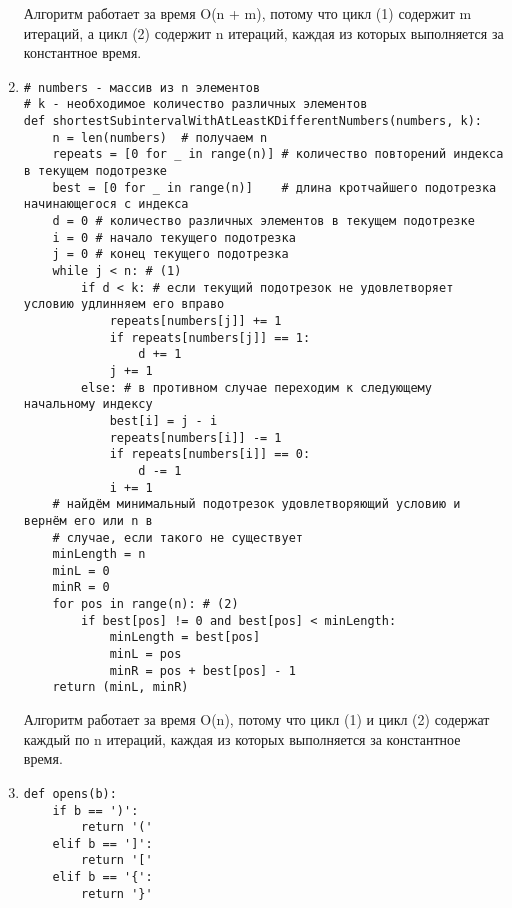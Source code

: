 \documentclass{article}
\begin{document}
\begin{enumerate}
Алгоритм работает за время O(n + m), потому что цикл (1) содержит m итераций, а
цикл (2) содержит n итераций, каждая из которых выполняется за константное
время.

\clearpage

\item

\begin{verbatim}
# numbers - массив из n элементов
# k - необходимое количество различных элементов
def shortestSubintervalWithAtLeastKDifferentNumbers(numbers, k):
    n = len(numbers)  # получаем n
    repeats = [0 for _ in range(n)] # количество повторений индекса в текущем подотрезке
    best = [0 for _ in range(n)]    # длина кротчайшего подотрезка начинающегося с индекса 
    d = 0 # количество различных элементов в текущем подотрезке
    i = 0 # начало текущего подотрезка
    j = 0 # конец текущего подотрезка
    while j < n: # (1)
        if d < k: # если текущий подотрезок не удовлетворяет условию удлинняем его вправо
            repeats[numbers[j]] += 1
            if repeats[numbers[j]] == 1:
                d += 1
            j += 1
        else: # в противном случае переходим к следующему начальному индексу
            best[i] = j - i
            repeats[numbers[i]] -= 1
            if repeats[numbers[i]] == 0:
                d -= 1
            i += 1
    # найдём минимальный подотрезок удовлетворяющий условию и вернём его или n в
    # случае, если такого не существует
    minLength = n
    minL = 0
    minR = 0
    for pos in range(n): # (2)
        if best[pos] != 0 and best[pos] < minLength:
            minLength = best[pos]
            minL = pos
            minR = pos + best[pos] - 1
    return (minL, minR)
\end{verbatim}

Алгоритм работает за время O(n), потому что цикл (1) и цикл (2) содержат каждый
по n итераций, каждая из которых выполняется за константное время.

\clearpage

\item

\begin{verbatim}
def opens(b):
    if b == ')':
        return '('
    elif b == ']':
        return '['
    elif b == '{':
        return '}'


\end{verbatim}
\end{enumerate}
\end{document}
